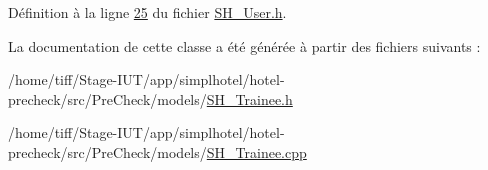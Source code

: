 Définition à la ligne \hyperlink{SH__User_8h_source_l00025}{25} du fichier \hyperlink{SH__User_8h_source}{S\-H\-\_\-\-User.\-h}.



La documentation de cette classe a été générée à partir des fichiers suivants \-:\begin{DoxyCompactItemize}
\item 
/home/tiff/\-Stage-\/\-I\-U\-T/app/simplhotel/hotel-\/precheck/src/\-Pre\-Check/models/\hyperlink{SH__Trainee_8h}{S\-H\-\_\-\-Trainee.\-h}\item 
/home/tiff/\-Stage-\/\-I\-U\-T/app/simplhotel/hotel-\/precheck/src/\-Pre\-Check/models/\hyperlink{SH__Trainee_8cpp}{S\-H\-\_\-\-Trainee.\-cpp}\end{DoxyCompactItemize}
